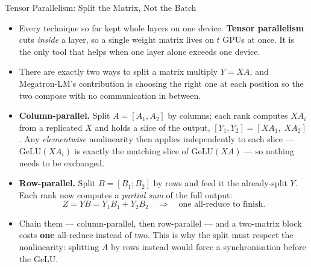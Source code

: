 \begin{frame}{Tensor Parallelism: Split the Matrix, Not the Batch}
  \begin{itemize}\footnotesize\itemsep0.35em
    \item[\textcolor{red}{$\blacktriangleright$}] Every technique so far kept whole layers on one device. \textbf{Tensor parallelism} cuts \emph{inside} a layer, so a single weight matrix lives on $t$ GPUs at once. It is the only tool that helps when one layer alone exceeds one device.
    \item[\textcolor{red}{$\blacktriangleright$}] There are exactly two ways to split a matrix multiply $Y = XA$, and Megatron-LM's contribution is choosing the right one at each position so the two compose with no communication in between.
    \item[\textcolor{red}{$\blacktriangleright$}] \textbf{Column-parallel.} Split $A = [A_1, A_2]$ by columns; each rank computes $XA_i$ from a replicated $X$ and holds a slice of the output, $[Y_1, Y_2] = [XA_1,\; XA_2]$. Any \emph{elementwise} nonlinearity then applies independently to each slice --- $\mathrm{GeLU}(XA_i)$ is exactly the matching slice of $\mathrm{GeLU}(XA)$ --- so nothing needs to be exchanged.
    \item[\textcolor{red}{$\blacktriangleright$}] \textbf{Row-parallel.} Split $B = [B_1; B_2]$ by rows and feed it the already-split $Y$. Each rank now computes a \emph{partial sum} of the full output:
      \[
        Z = YB = Y_1B_1 + Y_2B_2 \quad\Longrightarrow\quad \text{one all-reduce to finish.}
      \]
    \item[\textcolor{red}{$\blacktriangleright$}] Chain them --- column-parallel, then row-parallel --- and a two-matrix block costs \textbf{one} all-reduce instead of two. This is why the split must respect the nonlinearity: splitting $A$ by rows instead would force a synchronisation before the GeLU.
  \end{itemize}
\end{frame}

